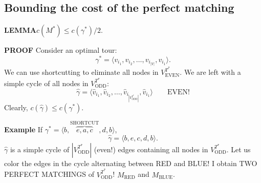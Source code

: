 \subsection{Bounding the cost of the perfect matching}
\begin{notesresult}
\textbf{LEMMA}\quad $c(M^*)\leq c(\gamma^*)/2$.
\end{notesresult}
\textbf{PROOF} Consider an optimal tour:
\[\gamma^*=\langle v_{i_1},v_{i_2},\ldots,v_{i_{|V|}},v_{i_1}\rangle.\]
We can use shortcutting to eliminate all nodes in $V_{\mathrm{EVEN}}^{T^*}$. We are left with a simple cycle of all nodes in $V_{\mathrm{ODD}}^{T^*}$:
\[\widehat\gamma=\langle\widehat v_{i_1},\widehat v_{i_2},\ldots,\widehat v_{i_{|V_{\mathrm{ODD}}^{T^*}|}},\widehat v_{i_1}\rangle\qquad\text{EVEN!}\]
Clearly, $c(\widehat\gamma)\leq c(\gamma^*)$.

\textbf{Example}
If $\gamma^*=\langle b,\overbrace{e,a,c}^{\mathrm{SHORTCUT}},d,b\rangle$,
\[\widehat\gamma=\langle b,e,c,d,b\rangle.\]
$\widehat\gamma$ is a simple cycle of $|V_{\mathrm{ODD}}^{T^*}|$ (even!) edges containing all nodes in $V_{\mathrm{ODD}}^{T^*}$.
Let us color the edges in the cycle alternating between RED and BLUE!
I obtain TWO PERFECT MATCHINGS of $V_{\mathrm{ODD}}^{T^*}$! $M_{\mathrm{RED}}$ and $M_{\mathrm{BLUE}}$.
